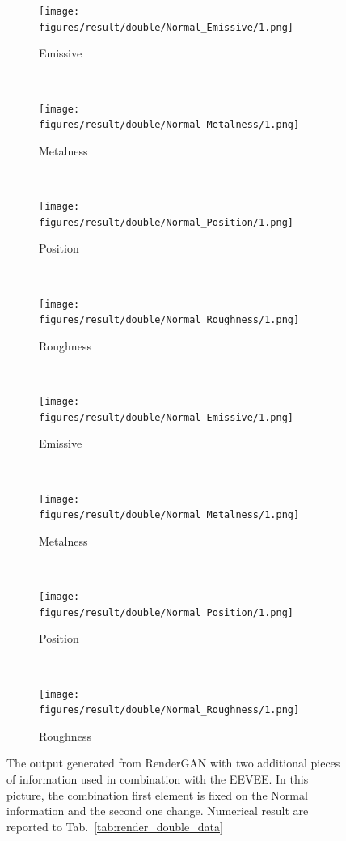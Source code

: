 \begin{figure}[h!]
    \centering
    \begin{subfigure}[b]{0.175\textwidth}
     \texttt{[image: figures/result/double/Normal\_Emissive/1.png]}
     \caption{Emissive}\label{subfig:1}
    \end{subfigure}
    ~
    \begin{subfigure}[b]{0.175\textwidth}
     \texttt{[image: figures/result/double/Normal\_Metalness/1.png]}
     \caption{Metalness}
    \end{subfigure}
    ~
    \begin{subfigure}[b]{0.175\textwidth}
     \texttt{[image: figures/result/double/Normal\_Position/1.png]}
     \caption{Position}
    \end{subfigure}
    ~
    \begin{subfigure}[b]{0.175\textwidth}
     \texttt{[image: figures/result/double/Normal\_Roughness/1.png]}
     \caption{Roughness}
    \end{subfigure}
    \\ \vspace{0.2cm} %
    \begin{subfigure}[b]{0.175\textwidth}
     \texttt{[image: figures/result/double/Normal\_Emissive/1.png]}
     \caption{Emissive}\label{subfig:1}
    \end{subfigure}
    ~
    \begin{subfigure}[b]{0.175\textwidth}
     \texttt{[image: figures/result/double/Normal\_Metalness/1.png]}
     \caption{Metalness}
    \end{subfigure}
    ~
    \begin{subfigure}[b]{0.175\textwidth}
     \texttt{[image: figures/result/double/Normal\_Position/1.png]}
     \caption{Position}
    \end{subfigure}
    ~
    \begin{subfigure}[b]{0.175\textwidth}
     \texttt{[image: figures/result/double/Normal\_Roughness/1.png]}
     \caption{Roughness}
    \end{subfigure}
    \caption[Generation Result with fixed input on Normal]{The output generated from RenderGAN with two additional pieces of information used in combination with the EEVEE. In this picture, the combination first element is fixed on the Normal information and the second one change. Numerical result are reported to Tab.~\ref{tab:render_double_data}}
    \label{fig:double_input_base_normal_generation}
\end{figure}

